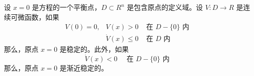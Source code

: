 \begin{theorem}
    设 $x=0$ 是方程的一个平衡点，$D \subset R^n$ 是包含原点的定义域。设 $V: D \rightarrow R$ 是连续可微函数，如果
    \begin{equation}
        \begin{array}{lll}
        V(0)=0,& V(x)>0 & \text { 在 } D-\{0\} \text { 内 } \\
        & \dot{V}(x) \leqslant 0 & \text { 在 } D \text { 内 }
        \end{array}
    \end{equation}
    那么，原点 $x=0$ 是稳定的。此外，如果
    \begin{equation}
        \dot{V}(x)<0 \quad \text { 在 } D-\{0\} \text { 内 }
    \end{equation}
    那么，原点 $x=0$ 是渐近稳定的。
\end{theorem}
